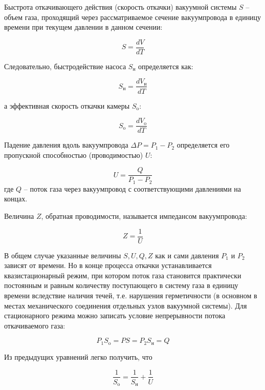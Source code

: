 \documentclass[a4paper, 12pt]{article} %
\begin{document}
Быстрота откачивающего действия (скорость откачки) вакуумной системы $S$ -- объем газа, проходящий через рассматриваемое сечение вакуумпровода в единицу времени при текущем давлении
в данном сечении:
 
\begin{equation}
	S = \frac{dV}{dT}
\end{equation}

Следовательно, быстродействие насоса $S_{\text{н}}$ определяется как:

\begin{equation}
	S_{\text{н}} = \frac{dV_{\text{н}}}{dT}
\end{equation}

а эффективная скорость откачки камеры $S_{\text{o}}$:

\begin{equation}
	S_{\text{o}} = \frac{dV_{\text{o}}}{dT}
\end{equation}

Падение давления вдоль вакуумпровода $\Delta P = P_1 - P_2$ определяется его пропускной способностью (проводимостью) $U$:

\begin{equation}
	U = \frac{Q}{P_1 - P_2}
\end{equation}
где $Q$ -- поток газа через вакуумпровод с соответствующими
давлениями на концах.

Величина $Z$, обратная проводимости, называется импедансом вакуумпровода:

\begin{equation}
	Z = \frac{1}{U}
\end{equation}

В общем случае указанные величины $S, U, Q, Z$ как и сами давления $P_1$ и $P_2$ зависят от времени. Но в конце процесса откачки устанавливается квазистационарный режим, при котором поток газа становится практически постоянным и равным количеству поступающего в систему газа
в единицу времени вследствие наличия течей, т.е. нарушения герметичности (в основном в местах механического соединения отдельных узлов
вакуумной системы). Для стационарного режима можно записать условие
непрерывности потока откачиваемого газа:

\begin{equation}
	P_1S_{\text{o}} = PS = P_2S_{\text{н}} = Q
\end{equation}

Из предыдущих уравнений легко получить, что

\begin{equation}
	\frac{1}{S_{\text{o}}} = \frac{1}{S_{\text{н}}} + \frac{1}{U}
\end{equation}
\end{document}
